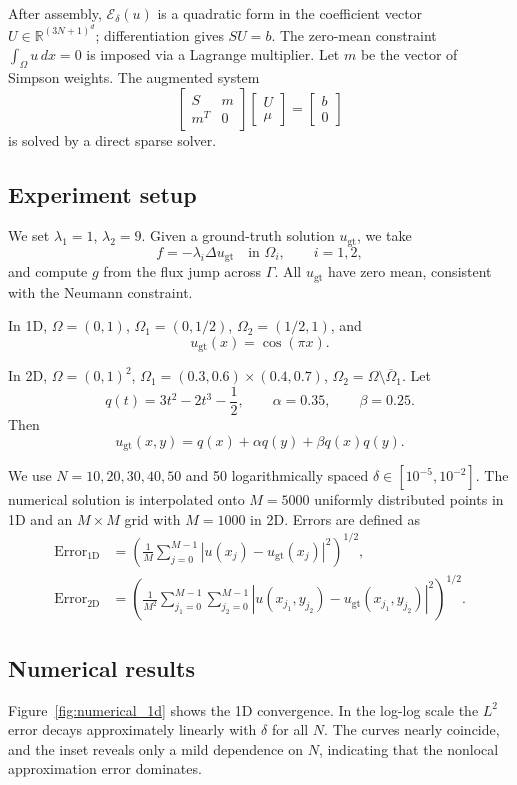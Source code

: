 \documentclass{article}
\theoremstyle{definition}
\begin{document}
After assembly, $\mathcal{E}_\delta(u)$ is a quadratic form in the coefficient vector $U\in\mathbb{R}^{(3N+1)^d}$; differentiation gives $SU=b$. The zero-mean constraint $\int_\Omega u\,dx=0$ is imposed via a Lagrange multiplier. Let $m$ be the vector of Simpson weights. The augmented system
\[
  \begin{bmatrix}
  S & m\\
  m^T & 0
  \end{bmatrix}
  \begin{bmatrix}
  U\\ \mu
  \end{bmatrix}
  =
  \begin{bmatrix}
  b\\0
  \end{bmatrix}
\]
is solved by a direct sparse solver.

\subsection{Experiment setup}
We set $\lambda_1=1$, $\lambda_2=9$. Given a ground-truth solution $u_{\mathrm{gt}}$, we take
\[
  f=-\lambda_i\Delta u_{\mathrm{gt}}\quad \mbox{in } \Omega_i,\qquad i=1,2,
\]
and compute $g$ from the flux jump across $\Gamma$. All $u_{\mathrm{gt}}$ have zero mean, consistent with the Neumann constraint.

In 1D, $\Omega=(0,1)$, $\Omega_1=(0,1/2)$, $\Omega_2=(1/2,1)$, and
\[
u_{\mathrm{gt}}(x)=\cos(\pi x).
\]

In 2D, $\Omega=(0,1)^2$, $\Omega_1=(0.3,0.6)\times(0.4,0.7)$, $\Omega_2=\Omega\setminus\overline{\Omega}_1$.
Let
\[
q(t)=3t^2-2t^3-\frac{1}{2},\qquad \alpha=0.35,\qquad \beta=0.25.
\]
Then
\[
u_{\mathrm{gt}}(x,y)=q(x)+\alpha q(y)+\beta q(x)q(y).
\]

We use $N=10,20,30,40,50$ and 50 logarithmically spaced $\delta\in[10^{-5},10^{-2}]$. The numerical solution is interpolated onto $M=5000$ uniformly distributed points in 1D and an $M\times M$ grid with $M=1000$ in 2D. Errors are defined as
\begin{align*}
\operatorname{Error}_{\text{1D}}
&=\left(\frac{1}{M}\sum_{j=0}^{M-1}|u(x_j)-u_{\mathrm{gt}}(x_j)|^2\right)^{1/2},\\
\operatorname{Error}_{\text{2D}}
&=\left(\frac{1}{M^2}\sum_{j_1=0}^{M-1}\sum_{j_2=0}^{M-1}
|u(x_{j_1},y_{j_2})-u_{\mathrm{gt}}(x_{j_1},y_{j_2})|^2\right)^{1/2}.
\end{align*}

\subsection{Numerical results}
Figure~\ref{fig:numerical_1d} shows the 1D convergence. In the log-log scale the $L^2$ error decays approximately linearly with $\delta$ for all $N$. The curves nearly coincide, and the inset reveals only a mild dependence on $N$, indicating that the nonlocal approximation error dominates.
\end{document}

